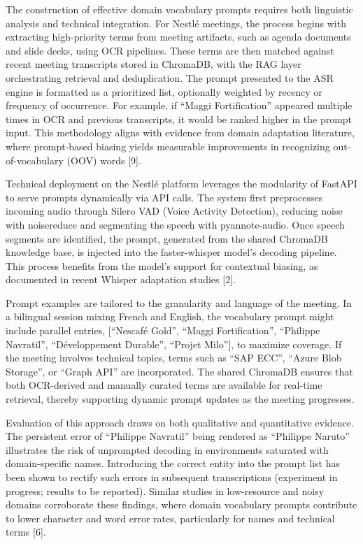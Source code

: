 \documentclass[12pt,a4paper]{article}
\begin{document}
The construction of effective domain vocabulary prompts requires both linguistic analysis and technical integration. For Nestlé meetings, the process begins with extracting high-priority terms from meeting artifacts, such as agenda documents and slide decks, using OCR pipelines. These terms are then matched against recent meeting transcripts stored in ChromaDB, with the RAG layer orchestrating retrieval and deduplication. The prompt presented to the ASR engine is formatted as a prioritized list, optionally weighted by recency or frequency of occurrence. For example, if “Maggi Fortification” appeared multiple times in OCR and previous transcripts, it would be ranked higher in the prompt input. This methodology aligns with evidence from domain adaptation literature, where prompt-based biasing yields measurable improvements in recognizing out-of-vocabulary (OOV) words [9].


Technical deployment on the Nestlé platform leverages the modularity of FastAPI to serve prompts dynamically via API calls. The system first preprocesses incoming audio through Silero VAD (Voice Activity Detection), reducing noise with noisereduce and segmenting the speech with pyannote-audio. Once speech segments are identified, the prompt, generated from the shared ChromaDB knowledge base, is injected into the faster-whisper model’s decoding pipeline. This process benefits from the model’s support for contextual biasing, as documented in recent Whisper adaptation studies [2].


Prompt examples are tailored to the granularity and language of the meeting. In a bilingual session mixing French and English, the vocabulary prompt might include parallel entries, [“Nescafé Gold”, “Maggi Fortification”, “Philippe Navratil”, “Développement Durable”, “Projet Milo”], to maximize coverage. If the meeting involves technical topics, terms such as “SAP ECC”, “Azure Blob Storage”, or “Graph API” are incorporated. The shared ChromaDB ensures that both OCR-derived and manually curated terms are available for real-time retrieval, thereby supporting dynamic prompt updates as the meeting progresses.


Evaluation of this approach draws on both qualitative and quantitative evidence. The persistent error of “Philippe Navratil” being rendered as “Philippe Naruto” illustrates the risk of unprompted decoding in environments saturated with domain-specific names. Introducing the correct entity into the prompt list has been shown to rectify such errors in subsequent transcriptions (experiment in progress; results to be reported). Similar studies in low-resource and noisy domains corroborate these findings, where domain vocabulary prompts contribute to lower character and word error rates, particularly for names and technical terms [6].
\end{document}
